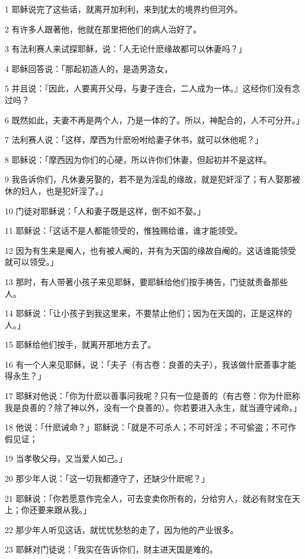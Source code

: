 \par 1 耶稣说完了这些话，就离开加利利，来到犹太的境界约但河外。
\par 2 有许多人跟著他，他就在那里把他们的病人治好了。
\par 3 有法利赛人来试探耶稣，说：「人无论什麽缘故都可以休妻吗？」
\par 4 耶稣回答说：「那起初造人的，是造男造女，
\par 5 并且说：『因此，人要离开父母，与妻子连合，二人成为一体。』这经你们没有念过吗？
\par 6 既然如此，夫妻不再是两个人，乃是一体的了。所以，神配合的，人不可分开。」
\par 7 法利赛人说：「这样，摩西为什麽吩咐给妻子休书，就可以休他呢？」
\par 8 耶稣说：「摩西因为你们的心硬，所以许你们休妻，但起初并不是这样。
\par 9 我告诉你们，凡休妻另娶的，若不是为淫乱的缘故，就是犯奸淫了；有人娶那被休的妇人，也是犯奸淫了。」
\par 10 门徒对耶稣说：「人和妻子既是这样，倒不如不娶。」
\par 11 耶稣说：「这话不是人都能领受的，惟独赐给谁，谁才能领受。
\par 12 因为有生来是阉人，也有被人阉的，并有为天国的缘故自阉的。这话谁能领受就可以领受。」
\par 13 那时，有人带著小孩子来见耶稣，要耶稣给他们按手祷告，门徒就责备那些人。
\par 14 耶稣说：「让小孩子到我这里来，不要禁止他们；因为在天国的，正是这样的人。」
\par 15 耶稣给他们按手，就离开那地方去了。
\par 16 有一个人来见耶稣，说：「夫子（有古卷：良善的夫子），我该做什麽善事才能得永生？」
\par 17 耶稣对他说：「你为什麽以善事问我呢？只有一位是善的（有古卷：你为什麽称我是良善的？除了神以外，没有一个良善的）。你若要进入永生，就当遵守诫命。」
\par 18 他说：「什麽诫命？」耶稣说：「就是不可杀人；不可奸淫；不可偷盗；不可作假见证；
\par 19 当孝敬父母，又当爱人如己。」
\par 20 那少年人说：「这一切我都遵守了，还缺少什麽呢？」
\par 21 耶稣说：「你若愿意作完全人，可去变卖你所有的，分给穷人，就必有财宝在天上；你还要来跟从我。」
\par 22 那少年人听见这话，就忧忧愁愁的走了，因为他的产业很多。
\par 23 耶稣对门徒说：「我实在告诉你们，财主进天国是难的。
